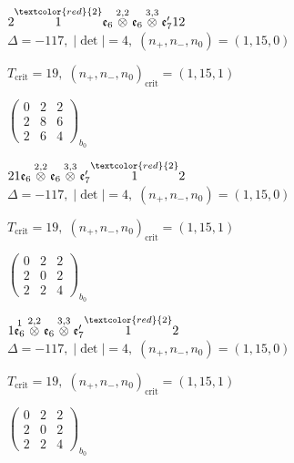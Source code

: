 \documentclass[10pt]{article}
\begin{document}
\smallskip

$2\overset{\textcolor{red}{2}}{1}\mathfrak{e}_6\overset{2,2}{\otimes}\mathfrak{e}_6\overset{3,3}{\otimes}\mathfrak{e}_7'12$ \quad $\Delta=-117,\; |\det|=4,\; (n_+,n_-,n_0)=(1,15,0)$

\hspace{1em}$T_{\text{crit}}=19,\; (n_+,n_-,n_0)_{\text{crit}}=(1,15,1)$

\hspace{2em}$\left(\begin{smallmatrix}0 & 2 & 2 \\ 2 & 8 & 6 \\ 2 & 6 & 4\end{smallmatrix}\right)_{\!b_0}$

$21\mathfrak{e}_6\overset{2,2}{\otimes}\mathfrak{e}_6\overset{3,3}{\otimes}\mathfrak{e}_7'\overset{\textcolor{red}{2}}{1}2$ \quad $\Delta=-117,\; |\det|=4,\; (n_+,n_-,n_0)=(1,15,0)$

\hspace{1em}$T_{\text{crit}}=19,\; (n_+,n_-,n_0)_{\text{crit}}=(1,15,1)$

\hspace{2em}$\left(\begin{smallmatrix}0 & 2 & 2 \\ 2 & 0 & 2 \\ 2 & 2 & 4\end{smallmatrix}\right)_{\!b_0}$

\smallskip

$1\overset{1}{\mathfrak{e}_6}\overset{2,2}{\otimes}\mathfrak{e}_6\overset{3,3}{\otimes}\mathfrak{e}_7'\overset{\textcolor{red}{2}}{1}2$ \quad $\Delta=-117,\; |\det|=4,\; (n_+,n_-,n_0)=(1,15,0)$

\hspace{1em}$T_{\text{crit}}=19,\; (n_+,n_-,n_0)_{\text{crit}}=(1,15,1)$

\hspace{2em}$\left(\begin{smallmatrix}0 & 2 & 2 \\ 2 & 0 & 2 \\ 2 & 2 & 4\end{smallmatrix}\right)_{\!b_0}$

\smallskip
\end{document}
